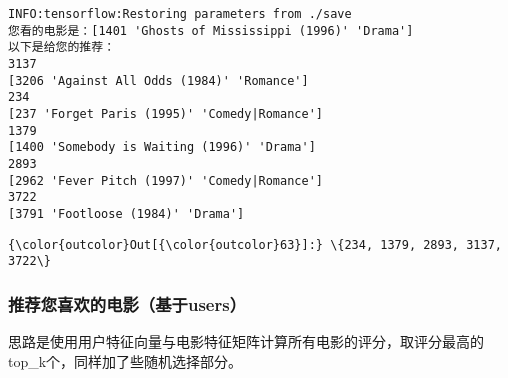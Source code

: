\documentclass[11pt]{article}
\begin{document}
    \begin{Verbatim}[commandchars=\\\{\}]
INFO:tensorflow:Restoring parameters from ./save
您看的电影是：[1401 'Ghosts of Mississippi (1996)' 'Drama']
以下是给您的推荐：
3137
[3206 'Against All Odds (1984)' 'Romance']
234
[237 'Forget Paris (1995)' 'Comedy|Romance']
1379
[1400 'Somebody is Waiting (1996)' 'Drama']
2893
[2962 'Fever Pitch (1997)' 'Comedy|Romance']
3722
[3791 'Footloose (1984)' 'Drama']

    \end{Verbatim}

\begin{Verbatim}[commandchars=\\\{\}]
{\color{outcolor}Out[{\color{outcolor}63}]:} \{234, 1379, 2893, 3137, 3722\}
\end{Verbatim}
            
    \subsubsection{推荐您喜欢的电影（基于users）}\label{ux63a8ux8350ux60a8ux559cux6b22ux7684ux7535ux5f71ux57faux4e8eusers}

思路是使用用户特征向量与电影特征矩阵计算所有电影的评分，取评分最高的top\_k个，同样加了些随机选择部分。
\end{document}
